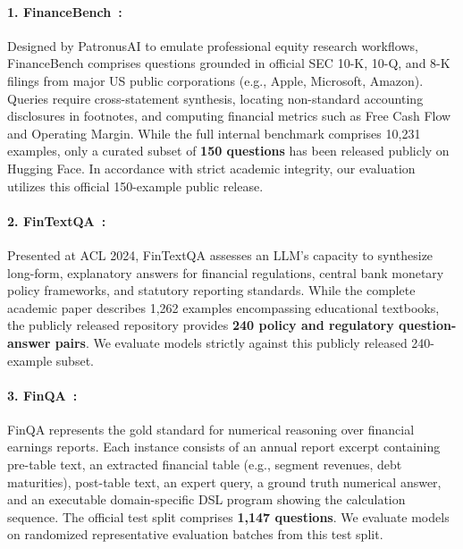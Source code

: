 \documentclass[11pt]{article}
\begin{document}
\paragraph{1. FinanceBench~\citep{islam2023financebench}:} 
Designed by PatronusAI to emulate professional equity research workflows, FinanceBench comprises questions grounded in official SEC 10-K, 10-Q, and 8-K filings from major US public corporations (e.g., Apple, Microsoft, Amazon). Queries require cross-statement synthesis, locating non-standard accounting disclosures in footnotes, and computing financial metrics such as Free Cash Flow and Operating Margin. While the full internal benchmark comprises 10,231 examples, only a curated subset of \textbf{150 questions} has been released publicly on Hugging Face. In accordance with strict academic integrity, our evaluation utilizes this official 150-example public release.

\paragraph{2. FinTextQA~\citep{chen2024fintextqa}:}
Presented at ACL 2024, FinTextQA assesses an LLM's capacity to synthesize long-form, explanatory answers for financial regulations, central bank monetary policy frameworks, and statutory reporting standards. While the complete academic paper describes 1,262 examples encompassing educational textbooks, the publicly released repository provides \textbf{240 policy and regulatory question-answer pairs}. We evaluate models strictly against this publicly released 240-example subset.

\paragraph{3. FinQA~\citep{chen2021finqa}:}
FinQA represents the gold standard for numerical reasoning over financial earnings reports. Each instance consists of an annual report excerpt containing pre-table text, an extracted financial table (e.g., segment revenues, debt maturities), post-table text, an expert query, a ground truth numerical answer, and an executable domain-specific DSL program showing the calculation sequence. The official test split comprises \textbf{1,147 questions}. We evaluate models on randomized representative evaluation batches from this test split.
\end{document}
